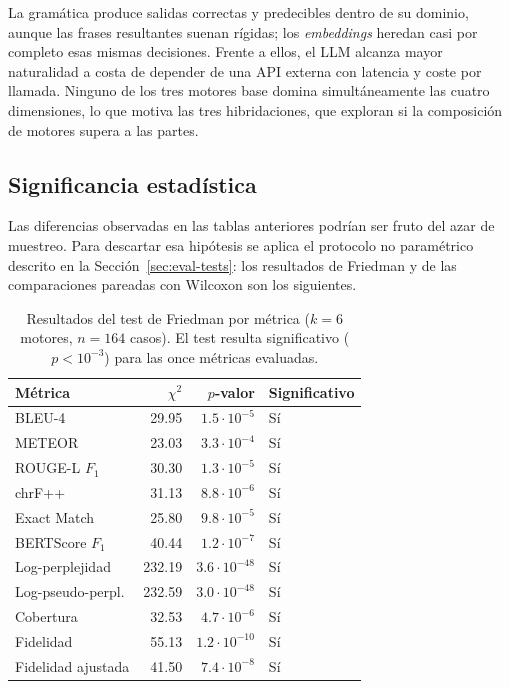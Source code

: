 La gramática produce salidas correctas y predecibles dentro de su dominio, aunque las frases resultantes suenan rígidas; los \textit{embeddings} heredan casi por completo esas mismas decisiones. Frente a ellos, el LLM alcanza mayor naturalidad a costa de depender de una API externa con latencia y coste por llamada. Ninguno de los tres motores base domina simultáneamente las cuatro dimensiones, lo que motiva las tres hibridaciones, que exploran si la composición de motores supera a las partes.

\subsection{Significancia estadística}
\label{sec:eval-significancia}

Las diferencias observadas en las tablas anteriores podrían ser fruto del azar de muestreo. Para descartar esa hipótesis se aplica el protocolo no paramétrico descrito en la Sección~\ref{sec:eval-tests}: los resultados de Friedman y de las comparaciones pareadas con Wilcoxon son los siguientes.

\begin{table}[ht]
\centering
\begin{tabular}{l r r l}
\hline
Métrica & $\chi^2$ & $p$-valor & Significativo \\
\hline
BLEU-4 & 29.95 & $1.5 \cdot 10^{-5}$ & Sí \\
METEOR & 23.03 & $3.3 \cdot 10^{-4}$ & Sí \\
ROUGE-L $F_1$ & 30.30 & $1.3 \cdot 10^{-5}$ & Sí \\
chrF++ & 31.13 & $8.8 \cdot 10^{-6}$ & Sí \\
Exact Match & 25.80 & $9.8 \cdot 10^{-5}$ & Sí \\
BERTScore $F_1$ & 40.44 & $1.2 \cdot 10^{-7}$ & Sí \\
Log-perplejidad & 232.19 & $3.6 \cdot 10^{-48}$ & Sí \\
Log-pseudo-perpl. & 232.59 & $3.0 \cdot 10^{-48}$ & Sí \\
Cobertura & 32.53 & $4.7 \cdot 10^{-6}$ & Sí \\
Fidelidad & 55.13 & $1.2 \cdot 10^{-10}$ & Sí \\
Fidelidad ajustada & 41.50 & $7.4 \cdot 10^{-8}$ & Sí \\
\hline
\end{tabular}
\caption{Resultados del test de Friedman por métrica ($k=6$ motores, $n=164$ casos). El test resulta significativo ($p < 10^{-3}$) para las once métricas evaluadas.}
\label{tab:eval-friedman}
\end{table}

